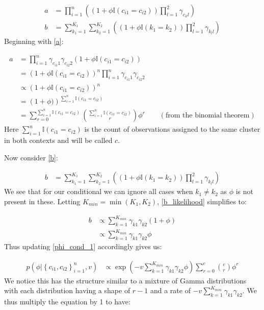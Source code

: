 \documentclass[11pt]{article} %
\begin{document}
\begin{align}
a &=  \prod_{i = 1}^n \left(\left(1 + \phi \mathbb{I}(c_{i1} = c_{i2})\right) \prod_{l = 1}^{2}\gamma_{c_{il}l}\right)  \label{a} \\
b &=  \sum_{k_1=1}^{K_1}\sum_{k_2=1}^{K_2}\left(\left(1 + \phi\mathbb{I}(k_1 = k_2)\right) \prod_{l=1}^2\gamma_{k_ll}\right) \label{b}
\end{align}
Beginning with \eqref{a}:

\begin{align}
a &= \prod_{i = 1}^n \gamma_{c_{i1}1} \gamma_{c_{i2}2}  \left(1 + \phi \mathbb{I}(c_{i1} = c_{i2})\right) \\
 &= \left(1 + \phi \mathbb{I}(c_{i1} = c_{i2})\right)^n \prod_{i = 1}^n \gamma_{c_{i1}1} \gamma_{c_{i2}2} \\
 &\propto  \left(1 + \phi \mathbb{I}(c_{i1} = c_{i2})\right)^n \\
 &=  \left(1 + \phi)\right)^{\sum_{i=1}^n  \mathbb{I}(c_{i1} = c_{i2})} \\
 &= \sum_{r=0}^{\sum_{i=1}^n  \mathbb{I}(c_{i1} = c_{i2})} \binom{\sum_{i=1}^n  \mathbb{I}(c_{i1} = c_{i2})}{r} \phi^r \qquad (\text{from the binomial theorem})
\end{align}
Here $\sum_{i=1}^n  \mathbb{I}(c_{i1} = c_{i2})$ is the count of observations assigned to the same cluster in both contexts and will be called $c$.

Now consider \eqref{b}:

\begin{align} \label{b_likelihood}
b &=  \sum_{k_1=1}^{K_1}\sum_{k_2=1}^{K_2}\left(\left(1 + \phi\mathbb{I}(k_1 = k_2)\right) \prod_{l=1}^2\gamma_{k_ll}\right)
\end{align}
We see that for our conditional we can ignore all cases when $k_1 \neq k_2$ as $\phi$ is not present in these. Letting $K_{min} = \min(K_1,K_2)$, \eqref{b_likelihood} simplifies to:

\begin{align}
b &\propto \sum_{k=1}^{K_{min}}\gamma_{k1} \gamma_{k2} \left(1 + \phi\right) \\
&\propto \sum_{k=1}^{K_{min}} \gamma_{k1} \gamma_{k2} \phi
\end{align}
Thus updating \eqref{phi_cond_1} accordingly gives us:

\begin{align}
p(\phi | \left\{c_{i1}, c_{i2}\right\}_{i=1}^n, v) &\propto \exp\left(-v \sum_{k=1}^{K_{min}}\gamma_{k1} \gamma_{k2}\phi\right)  \sum_{r=0}^c \binom{c}{r} \phi^r
\end{align}
We notice this has the structure similar to a mixture of Gamma distributions with each distribution having a shape of $r-1$ and a rate of $-v\sum_{k=1}^{K_{min}}\gamma_{k1} \gamma_{k2}$. We thus multiply the equation by 1 to have:
\end{document}
